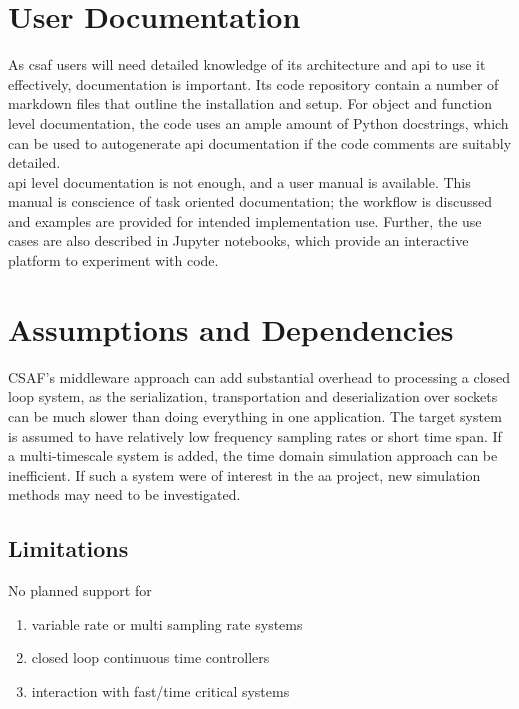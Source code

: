 \section{User Documentation}

As \acrshort{csaf} users will need detailed knowledge of its architecture and \acrshort{api} to use it effectively, documentation is important. Its code repository contain a number of markdown files that outline the installation and setup. For object and function level documentation, the code uses an ample amount of Python docstrings, which can be used to autogenerate \acrshort{api} documentation if the code comments are suitably detailed. \\

\acrshort{api} level documentation is not enough, and  a user manual is available. This manual is conscience of task oriented documentation; the workflow is discussed and examples are provided for intended implementation use. Further, the use cases are also described in Jupyter notebooks, which provide an interactive platform to experiment with code.

\section{Assumptions and Dependencies}

CSAF's middleware approach can add substantial overhead to processing a closed loop system, as the serialization, transportation and deserialization over sockets can be much slower than doing everything in one application. The target system is assumed to have relatively low frequency sampling rates or short time span. If a multi-timescale system is added, the time domain simulation approach can be inefficient. If such a system were of interest in the \acrshort{aa} project, new simulation methods may need to be investigated.\\

\subsection{Limitations}

No planned support for
\begin{enumerate}
\item   variable rate or multi sampling rate systems
\item  closed loop continuous time controllers
\item interaction with fast/time critical systems
\end{enumerate}
